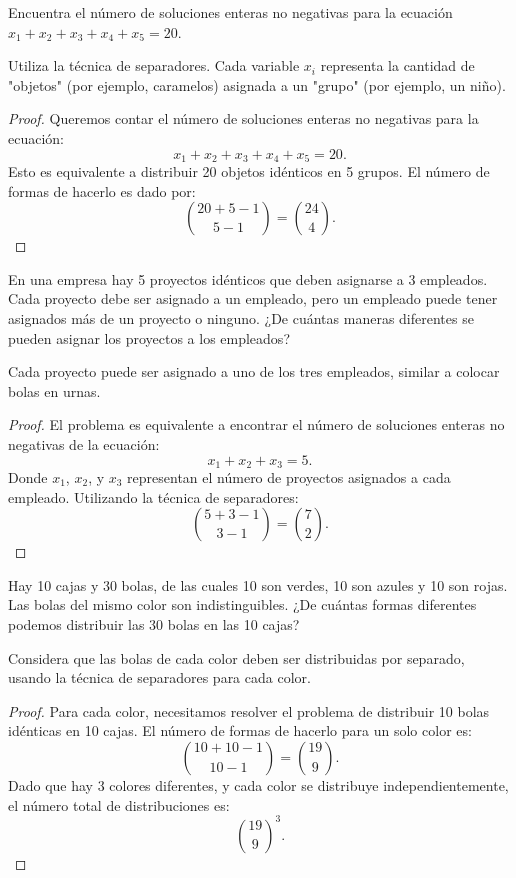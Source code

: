 \documentclass[11pt]{scrartcl}
\begin{document}
\begin{problem}
Encuentra el número de soluciones enteras no negativas para la ecuación \(x_1 + x_2 + x_3 + x_4 + x_5 = 20\).
\begin{hint}
Utiliza la técnica de separadores. Cada variable \(x_i\) representa la cantidad de "objetos" (por ejemplo, caramelos) asignada a un "grupo" (por ejemplo, un niño).
\begin{proof}
Queremos contar el número de soluciones enteras no negativas para la ecuación:
\[ x_1 + x_2 + x_3 + x_4 + x_5 = 20. \]
Esto es equivalente a distribuir 20 objetos idénticos en 5 grupos. El número de formas de hacerlo es dado por:
\[ \binom{20+5-1}{5-1} = \binom{24}{4}. \]
\end{proof}
\end{hint}
\end{problem}

\begin{problem}
En una empresa hay 5 proyectos idénticos que deben asignarse a 3 empleados. Cada proyecto debe ser asignado a un empleado, pero un empleado puede tener asignados más de un proyecto o ninguno. ¿De cuántas maneras diferentes se pueden asignar los proyectos a los empleados?
\begin{hint}
Cada proyecto puede ser asignado a uno de los tres empleados, similar a colocar bolas en urnas.
\begin{proof}
El problema es equivalente a encontrar el número de soluciones enteras no negativas de la ecuación:
\[ x_1 + x_2 + x_3 = 5. \]
Donde \(x_1\), \(x_2\), y \(x_3\) representan el número de proyectos asignados a cada empleado. Utilizando la técnica de separadores:
\[ \binom{5+3-1}{3-1} = \binom{7}{2}. \]
\end{proof}
\end{hint}
\end{problem}

\begin{problem}
Hay 10 cajas y 30 bolas, de las cuales 10 son verdes, 10 son azules y 10 son rojas. Las bolas del mismo color son indistinguibles. ¿De cuántas formas diferentes podemos distribuir las 30 bolas en las 10 cajas?
\begin{hint}
Considera que las bolas de cada color deben ser distribuidas por separado, usando la técnica de separadores para cada color.
\begin{proof}
Para cada color, necesitamos resolver el problema de distribuir 10 bolas idénticas en 10 cajas. El número de formas de hacerlo para un solo color es:
\[ \binom{10+10-1}{10-1} = \binom{19}{9}. \]
Dado que hay 3 colores diferentes, y cada color se distribuye independientemente, el número total de distribuciones es:
\[ \binom{19}{9}^3. \]
\end{proof}
\end{hint}
\end{problem}
\end{document}
